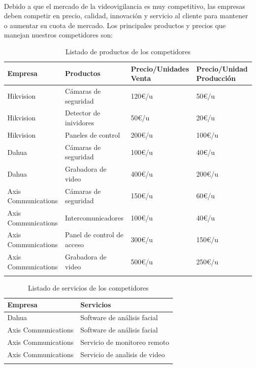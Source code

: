 \documentclass{report}
\begin{document}
        \paragraph*{}{
          Debido a que el mercado de la videovigilancia es muy competitivo, las empresas deben competir en precio, calidad, innovación y servicio al cliente para mantener o aumentar su cuota de mercado.
          Los principales productos y precios que manejan nuestros competidores son:
        }
        \begin{longtable}{|p{4cm}|p{5cm}|p{3cm}|p{3cm}|}
          \hline
          \textbf{Empresa} & \textbf{Productos} & \textbf{Precio/Unidades Venta} & \textbf{Precio/Unidad Producción}\\
          \hline
          \hline
          Hikvision & Cámaras de seguridad & 120€/u & 50€/u\\
          \hline
          Hikvision & Detector de inividores & 50€/u & 20€/u\\
          \hline
          Hikvision & Paneles de control & 200€/u & 100€/u\\
          \hline
          Dahua & Cámaras de seguridad & 100€/u & 40€/u\\
          \hline
          Dahua & Grabadora de video & 400€/u & 200€/u\\
          \hline
          Axis Communications & Cámaras de seguridad & 150€/u & 60€/u\\
          \hline
          Axis Communications & Intercomunicadores & 100€/u & 40€/u\\
          \hline
          Axis Communications & Panel de control de acceso & 300€/u & 150€/u\\
          \hline
          Axis Communications & Grabadora de video & 500€/u & 250€/u\\
          \hline
          \caption{Listado de productos de los competidores}
        \end{longtable}
        \begin{longtable}{|p{5cm}|p{11cm}|}
          \hline
          \textbf{Empresa} & \textbf{Servicios}\\
          \hline
          Dahua & Software de análisis facial\\
          \hline
          Axis Communications & Software de análisis facial\\
          \hline
          Axis Communications & Servicio de monitoreo remoto\\
          \hline
          Axis Communications & Servicio de analisis de video\\
          \hline
          \caption{Listado de servicios de los competidores}
        \end{longtable}
\end{document}
